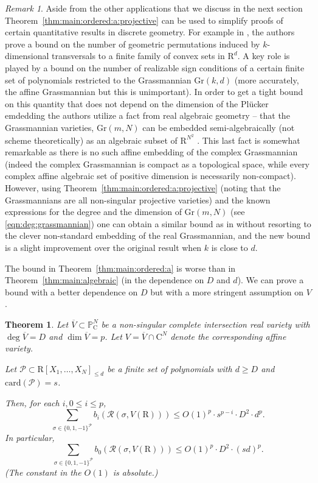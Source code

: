 \documentclass[10pt]{amsart}
\newtheorem{theorem}{Theorem}
\theoremstyle{definition}
\theoremstyle{remark}
\newtheorem{remark}{Remark}
\numberwithin{equation}{section}
\newcommand {\R} {\mathrm{R}}
\newcommand {\C}     {\mathrm{C}}
\newcommand {\RR} {{\mathcal R}}
\newcommand {\PP}     {\mathbb{P}} %
\newcommand{\card}{\mathrm{card}}
\newcommand{\Gr}{\mathrm{Gr}}
\begin{document}
\begin{remark}
    \label{rem:Grassmannian}
    Aside from the other applications that we discuss in the next section
    Theorem~\ref{thm:main:ordered:a:projective} can be used to simplify 
    proofs of certain quantitative results in discrete geometry. For example in \cite{GPW1996}, the authors prove a bound on the number of geometric permutations induced by $k$-dimensional transversals to a finite family of convex sets in $\R^d$. A key role is played by a bound on the number of realizable sign conditions of a certain finite set of polynomials restricted to the Grassmannian $\Gr(k,d)$ (more accurately, the affine Grassmannian but this is unimportant). In order to get a tight bound on this quantity that does not depend on the dimension of the Pl\"{u}cker emdedding the  
    authors utilize a fact from real algebraic geometry -- that the Grassmannian varieties, $\Gr(m,N)$ can be embedded semi-algebraically (not scheme theoretically) as an algebraic subset of $\R^{N^2}$ \cite[Theorem 3.4.4]{BCR}. This last fact is somewhat remarkable as there is no such affine embedding of the complex Grassmannian (indeed the complex Grassmannian is compact as a topological space, while every complex affine 
    algebraic set of positive dimension is necessarily non-compact). However, using Theorem~\ref{thm:main:ordered:a:projective} (noting that the Grassmannians are all non-singular projective varieties) 
    and the known expressions for the degree and the dimension of $\Gr(m,N)$
    (see \eqref{eqn:deg:grassmannian}) one can obtain a similar bound
    as in \cite[Theorem 2]{GPW1996} without resorting to the clever non-standard embedding of the real Grassmannian, and the new bound is a slight improvement over the original result when $k$ is close to $d$.
\end{remark}




The bound in Theorem~\ref{thm:main:ordered:a} is worse than in Theorem~\ref{thm:main:algebraic} (in the dependence on $D$ and $d$). We can prove a bound with a better dependence on $D$ 
but with a more stringent assumption on $V$.

\begin{theorem}
\label{thm:main:ordered:c}
Let $\overline{V} \subset \PP_\C^N$ be a non-singular complete intersection real variety 
with $\deg \overline{V} = D$ and $\dim \overline{V} = p$. Let $V = \overline{V} \cap \C^N$ denote the corresponding affine variety.

  Let
    $\mathcal{P} \subset \R[X_1,\ldots,X_N]_{\leq d}$ be a finite set of polynomials with $d \geq D$ and  $\card(\mathcal{P}) = s$. 
    
    Then, for each $i, 0 \leq i \leq p$,
    \[
        \sum_{\sigma \in \{0,1,-1\}^{\mathcal{P}}} b_i(\RR(\sigma,V(\R)))
        \leq 
        O(1)^p \cdot s^{p-i} \cdot D^2 \cdot d^{p}.
    \]  
    In particular,
    \[
        \sum_{\sigma \in \{0,1,-1\}^{\mathcal{P}}} b_0(\RR(\sigma,V(\R)))
        \leq 
        O(1)^p \cdot D^2 \cdot (s d)^{p}.
    \]  
    (The constant in the $O(1)$ is absolute.)
\end{theorem}
\end{document}
